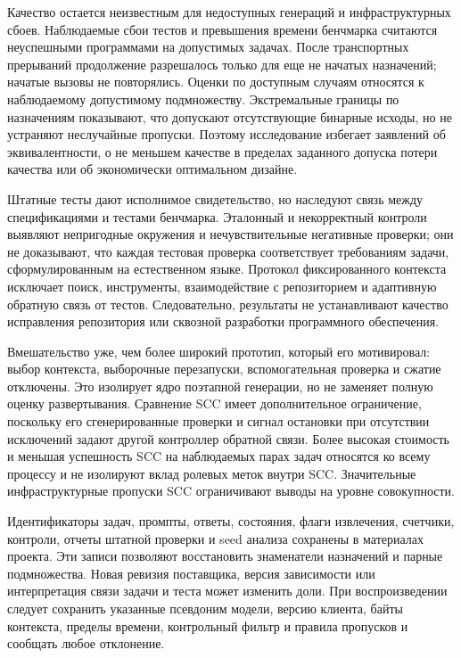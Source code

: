Качество остается неизвестным для недоступных генераций и инфраструктурных сбоев. Наблюдаемые сбои тестов и превышения времени бенчмарка считаются неуспешными программами на допустимых задачах. После транспортных прерываний продолжение разрешалось только для еще не начатых назначений; начатые вызовы не повторялись. Оценки по доступным случаям относятся к наблюдаемому допустимому подмножеству. Экстремальные границы по назначениям показывают, что допускают отсутствующие бинарные исходы, но не устраняют неслучайные пропуски. Поэтому исследование избегает заявлений об эквивалентности, о не меньшем качестве в пределах заданного допуска потери качества или об экономически оптимальном дизайне.

Штатные тесты дают исполнимое свидетельство, но наследуют связь между спецификациями и тестами бенчмарка. Эталонный и некорректный контроли выявляют непригодные окружения и нечувствительные негативные проверки; они не доказывают, что каждая тестовая проверка соответствует требованиям задачи, сформулированным на естественном языке. Протокол фиксированного контекста исключает поиск, инструменты, взаимодействие с репозиторием и адаптивную обратную связь от тестов. Следовательно, результаты не устанавливают качество исправления репозитория или сквозной разработки программного обеспечения.

Вмешательство уже, чем более широкий прототип, который его мотивировал: выбор контекста, выборочные перезапуски, вспомогательная проверка и сжатие отключены. Это изолирует ядро поэтапной генерации, но не заменяет полную оценку развертывания. Сравнение SCC имеет дополнительное ограничение, поскольку его сгенерированные проверки и сигнал остановки при отсутствии исключений задают другой контроллер обратной связи. Более высокая стоимость и меньшая успешность SCC на наблюдаемых парах задач относятся ко всему процессу и не изолируют вклад ролевых меток внутри SCC. Значительные инфраструктурные пропуски SCC ограничивают выводы на уровне совокупности.

Идентификаторы задач, промпты, ответы, состояния, флаги извлечения, счетчики, контроли, отчеты штатной проверки и seed анализа сохранены в материалах проекта. Эти записи позволяют восстановить знаменатели назначений и парные подмножества. Новая ревизия поставщика, версия зависимости или интерпретация связи задачи и теста может изменить доли. При воспроизведении следует сохранить указанные псевдоним модели, версию клиента, байты контекста, пределы времени, контрольный фильтр и правила пропусков и сообщать любое отклонение.

